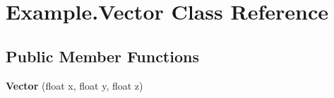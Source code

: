 \hypertarget{class_example_1_1_vector}{}\section{Example.\+Vector Class Reference}
\label{class_example_1_1_vector}


 


\subsection*{Public Member Functions}
\begin{DoxyCompactItemize}
\item 
\hypertarget{class_example_1_1_vector_ac17d93480759cbcdcafaefb1e9e2181f}{}{\bfseries Vector} (float x, float y, float z)\label{class_example_1_1_vector_ac17d93480759cbcdcafaefb1e9e2181f}

\end{DoxyCompactItemize}
